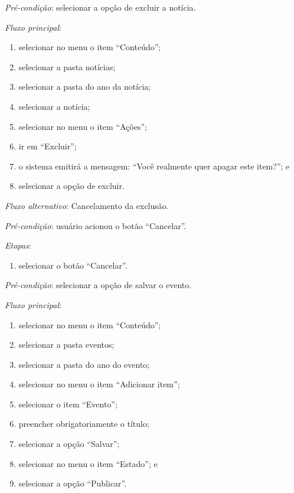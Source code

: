\vspace{0.7cm}

\noindent \textit{Pré-condição}: selecionar a opção de excluir a notícia.

\noindent \textit{Fluxo principal}:

\begin{enumerate}
    \item selecionar no menu o item ``Conteúdo'';
    \item selecionar a pasta notícias;
    \item selecionar a pasta do ano da notícia;
    \item selecionar a notícia;
    \item selecionar no menu o item ``Ações'';
    \item ir em ``Excluir'';
    \item o sistema emitirá a mensagem: ``Você realmente quer apagar este item?''; e
    \item selecionar a opção de excluir.
\end{enumerate}

\noindent \textit{Fluxo alternativo}: Cancelamento da exclusão.

\noindent \textit{Pré-condição}: usuário acionou o botão ``Cancelar''.

\noindent \textit{Etapas}:

\begin{enumerate}
    \item selecionar o botão ``Cancelar''.
\end{enumerate}


\vspace{0.7cm}

\noindent \textit{Pré-condição}: selecionar a opção de salvar o evento.

\noindent \textit{Fluxo principal}:

\begin{enumerate}
    \item selecionar no menu o item ``Conteúdo'';
    \item selecionar a pasta eventos;
    \item selecionar a pasta do ano do evento;
    \item selecionar no menu o item ``Adicionar item'';
    \item selecionar o item ``Evento'';
    \item preencher obrigatoriamente o título;
    \item selecionar a opção ``Salvar'';
    \item selecionar no menu o item ``Estado''; e
    \item selecionar a opção ``Publicar''.
\end{enumerate}

